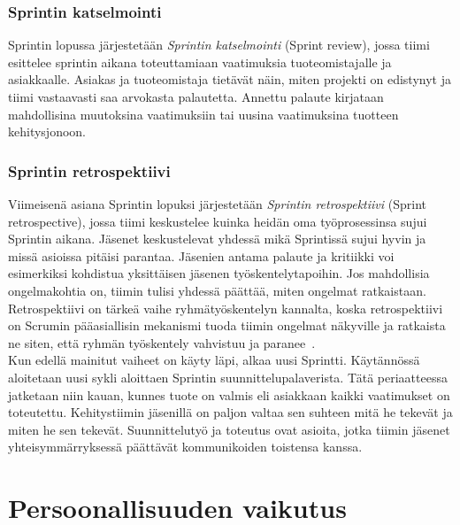 \documentclass[finnish]{../tktltiki2}
\theoremstyle{definition}
\theoremstyle{remark}
\begin{document}
\subsubsection{Sprintin katselmointi}

Sprintin lopussa järjestetään \emph{Sprintin katselmointi} (Sprint review), jossa tiimi esittelee sprintin aikana toteuttamiaan
vaatimuksia tuoteomistajalle ja asiakkaalle. Asiakas ja tuoteomistaja
tietävät näin, miten projekti on edistynyt ja tiimi vastaavasti saa
arvokasta palautetta. Annettu palaute kirjataan mahdollisina muutoksina
vaatimuksiin tai uusina vaatimuksina tuotteen kehitysjonoon.

\subsubsection{Sprintin retrospektiivi}

Viimeisenä asiana Sprintin lopuksi järjestetään \emph{Sprintin retrospektiivi}
(Sprint retrospective), jossa tiimi keskustelee kuinka heidän
oma työprosessinsa sujui Sprintin aikana. Jäsenet
keskustelevat yhdessä mikä Sprintissä sujui hyvin ja missä
asioissa pitäisi parantaa. Jäsenien antama palaute ja kritiikki
voi esimerkiksi kohdistua yksittäisen jäsenen työskentelytapoihin.
Jos mahdollisia ongelmakohtia on, tiimin tulisi yhdessä päättää,
miten ongelmat ratkaistaan. Retrospektiivi on tärkeä vaihe
ryhmätyöskentelyn kannalta, koska retrospektiivi on Scrumin pääasiallisin
mekanismi tuoda tiimin ongelmat näkyville ja ratkaista ne siten,
että ryhmän työskentely vahvistuu ja paranee~\cite{Scrumprimer}.\\

Kun edellä mainitut vaiheet on käyty läpi, alkaa uusi
Sprintti. Käytännös\-sä aloitetaan uusi sykli aloittaen
Sprintin suunnittelupalaverista. Tätä periaatteessa jatketaan
niin kauan, kunnes tuote on valmis eli asiakkaan kaikki vaatimukset
on toteutettu. Kehitystiimin jäsenillä on paljon valtaa sen suhteen mitä he tekevät ja miten he
sen tekevät. Suunnittelutyö ja toteutus ovat asioita, jotka tiimin
jäsenet yhteisymmärryksessä päättävät kommunikoiden toistensa kanssa.

\section{Persoonallisuuden vaikutus}
\end{document}
